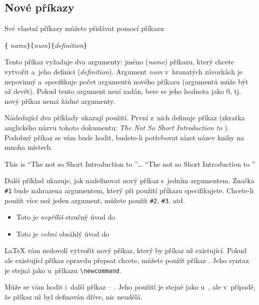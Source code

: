 \subsection{Nové příkazy}

Své vlastní příkazy můžete přidávat pomocí příkazu
\begin{lscommand}
\verb|{|%
       \emph{name}\verb|}[|\emph{num}\verb|]{|\emph{definition}\verb|}|
\end{lscommand}
Tento příkaz vyžaduje dva argumenty: jméno (\emph{name}) příkazu, který
chcete vytvořit a~jeho definici (\emph{definition}). Argument \emph{num}
v~hranatých závorkách je nepovinný a~specifikuje počet argumentů nového
příkazu (argumentů může být až devět). Pokud tento argument není zadán,
bere se jeho hodnota jako 0, tj. nový příkaz nemá žádné argumenty.

Následující dva příklady ukazují použití. První z~nich definuje příkaz
 (zkratka anglického názvu tohoto dokumentu: \emph{The Not So Short
Introduction to \LaTeXe}). Podobný příkaz se vám bude hodit, budete-li
potřebovat sázet název knihy na mnoha místech.

\begin{example}
\newcommand{\tnss}{The not
    so Short Introduction to
    \LaTeXe}
This is ``\tnss''\ldots{} 
``\tnss''
\end{example}

Další příklad ukazuje, jak nadefinovat nový příkaz s~jedním argumentem.
Značka \verb|#1| bude nahrazena argumentem, který při použití příkazu
specifikujete. Chcete-li použít více než jeden argument, můžete použít
\verb|#2|, \verb|#3|, atd.

\begin{example}
\newcommand{\txsit}[2]
 {Toto je \emph{#1} #2 úvod
 do \LaTeXe}
\begin{itemize}
\item \txsit{nepříliš}{stručný}
\item \txsit{velmi}{obsáhlý}
\end{itemize}
\end{example}

\LaTeX{} vám nedovolí vytvořit nový příkaz, který by 
příkaz už existující. Pokud ale existující příkaz opravdu přepsat
chcete, můžete použít příkaz . Jeho syntax je stejná
jako u~příkazu \verb|\newcommand|.

Může se vám hodit i~další příkaz -- . Jeho použití
je stejné jako u~, ale v~případě, že příkaz už byl
definován dříve,  nic neudělá.

